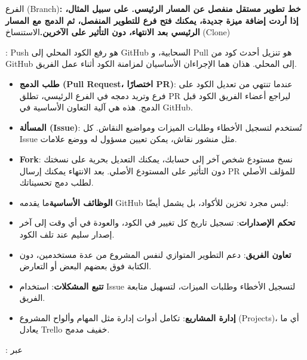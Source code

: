 الفرع (Branch)\textbf{: خط تطوير مستقل منفصل عن المسار الرئيسي. على سبيل المثال، إذا أردت إضافة ميزة جديدة، يمكنك فتح فرع للتطوير المنفصل، ثم الدمج مع المسار الرئيسي بعد الانتهاء، دون التأثير على الآخرين.}الاستنساخ (Clone)



: Push هو رفع الكود المحلي إلى GitHub السحابية، و Pull هو تنزيل أحدث كود من GitHub إلى المحلي. هذان هما الإجراءان الأساسيان لمزامنة الكود أثناء عمل الفريق.

\begin{itemize}
  \item \textbf{طلب الدمج (Pull Request، اختصارًا PR)}: عندما تنتهي من تعديل الكود على فرع وتريد دمجه في الفرع الرئيسي، تطلق PR ليراجع أعضاء الفريق الكود قبل الدمج. هذه هي آلية التعاون الأساسية في GitHub.
  \item \textbf{المسألة (Issue)}: تُستخدم لتسجيل الأخطاء وطلبات الميزات ومواضيع النقاش. كل Issue مثل منشور نقاش، يمكن تعيين مسؤول له ووضع علامات.
  \item \textbf{Fork}: نسخ مستودع شخص آخر إلى حسابك، يمكنك التعديل بحرية على نسختك دون التأثير على المستودع الأصلي. بعد الانتهاء يمكنك إرسال PR للمؤلف الأصلي لطلب دمج تحسيناتك.
  \item \textbf{الوظائف الأساسية}ما يقدمه GitHub ليس مجرد تخزين للأكواد، بل يشمل أيضًا:
  \item \textbf{تحكم الإصدارات}: تسجيل تاريخ كل تغيير في الكود، والعودة في أي وقت إلى آخر إصدار سليم عند تلف الكود.
  \item \textbf{تعاون الفريق}: دعم التطوير المتوازي لنفس المشروع من عدة مستخدمين، دون الكتابة فوق بعضهم البعض أو التعارض.
  \item \textbf{تتبع المشكلات}: استخدام Issue لتسجيل الأخطاء وطلبات الميزات، لتسهيل متابعة الفريق.
  \item \textbf{إدارة المشاريع}: تكامل أدوات إدارة مثل المهام وألواح المشروع (Projects)، أي ما يعادل Trello خفيف مدمج.
\end{itemize}


: عبر

